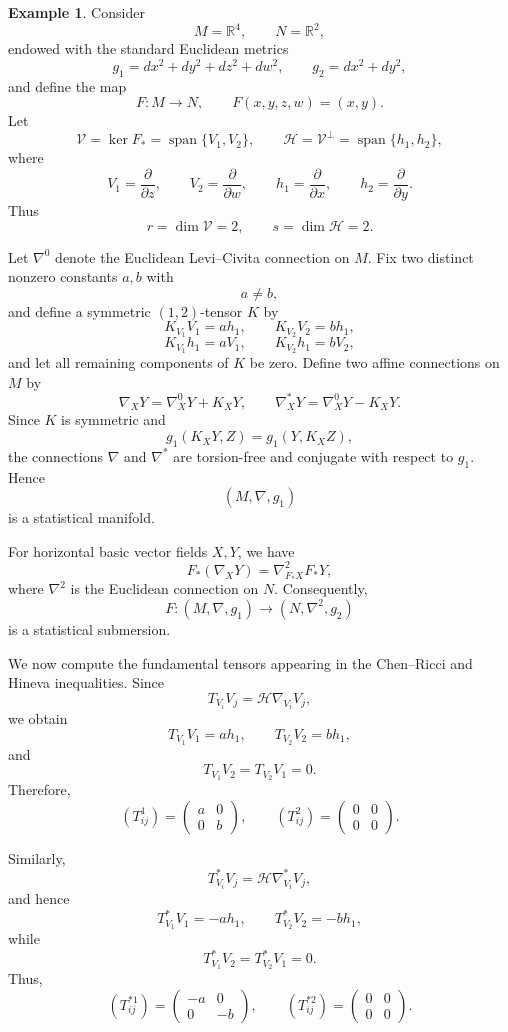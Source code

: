 \documentclass[10pt,a4paper]{article}
\theoremstyle{definition}
\newtheorem{example}[theorem]{Example}
\theoremstyle{remark}
\numberwithin{equation}{section}
\begin{document}
\begin{example}
Consider
\[
M=\mathbb{R}^{4},\qquad N=\mathbb{R}^{2},
\]
endowed with the standard Euclidean metrics
\[
g_{1}=dx^{2}+dy^{2}+dz^{2}+dw^{2},
\qquad
g_{2}=dx^{2}+dy^{2},
\]
and define the map
\[
F:M\longrightarrow N,\qquad
F(x,y,z,w)=(x,y).
\]
Let
\[
\mathcal{V}=\ker F_{*}
=\operatorname{span}\{V_{1},V_{2}\},
\qquad
\mathcal{H}=\mathcal{V}^{\perp}
=\operatorname{span}\{h_{1},h_{2}\},
\]
where
\[
V_{1}=\frac{\partial}{\partial z},\qquad
V_{2}=\frac{\partial}{\partial w},\qquad
h_{1}=\frac{\partial}{\partial x},\qquad
h_{2}=\frac{\partial}{\partial y}.
\]
Thus
\[
r=\dim\mathcal{V}=2,\qquad
s=\dim\mathcal{H}=2.
\]

Let $\nabla^{0}$ denote the Euclidean Levi--Civita connection on
$M$. Fix two distinct nonzero constants $a,b$ with
\[
a\neq b,
\]
and define a symmetric $(1,2)$-tensor $K$ by
\[
K_{V_{1}}V_{1}=ah_{1},\qquad
K_{V_{2}}V_{2}=bh_{1},
\]
\[
K_{V_{1}}h_{1}=aV_{1},\qquad
K_{V_{2}}h_{1}=bV_{2},
\]
and let all remaining components of $K$ be zero. Define two affine
connections on $M$ by
\[
\nabla_{X}Y=\nabla^{0}_{X}Y+K_{X}Y,
\qquad
\nabla^{*}_{X}Y=\nabla^{0}_{X}Y-K_{X}Y.
\]
Since $K$ is symmetric and
\[
g_{1}(K_{X}Y,Z)=g_{1}(Y,K_{X}Z),
\]
the connections $\nabla$ and $\nabla^{*}$ are torsion-free and
conjugate with respect to $g_{1}$. Hence
\[
(M,\nabla,g_{1})
\]
is a statistical manifold.

For horizontal basic vector fields $X,Y$, we have
\[
F_{*}(\nabla_{X}Y)
=
\nabla^{2}_{F_{*}X}F_{*}Y,
\]
where $\nabla^{2}$ is the Euclidean connection on $N$. Consequently,
\[
F:(M,\nabla,g_{1})
\longrightarrow
(N,\nabla^{2},g_{2})
\]
is a statistical submersion.

We now compute the fundamental tensors appearing in the
Chen--Ricci and Hineva inequalities. Since
\[
T_{V_{i}}V_{j}
=
\mathcal{H}\nabla_{V_{i}}V_{j},
\]
we obtain
\[
T_{V_{1}}V_{1}=ah_{1},\qquad
T_{V_{2}}V_{2}=bh_{1},
\]
and
\[
T_{V_{1}}V_{2}
=
T_{V_{2}}V_{1}
=
0.
\]
Therefore,
\[
\left(T^{1}_{ij}\right)
=
\begin{pmatrix}
a&0\\
0&b
\end{pmatrix},
\qquad
\left(T^{2}_{ij}\right)
=
\begin{pmatrix}
0&0\\
0&0
\end{pmatrix}.
\]

Similarly,
\[
T^{*}_{V_{i}}V_{j}
=
\mathcal{H}\nabla^{*}_{V_{i}}V_{j},
\]
and hence
\[
T^{*}_{V_{1}}V_{1}=-ah_{1},
\qquad
T^{*}_{V_{2}}V_{2}=-bh_{1},
\]
while
\[
T^{*}_{V_{1}}V_{2}
=
T^{*}_{V_{2}}V_{1}
=
0.
\]
Thus,
\[
\left(T^{*1}_{ij}\right)
=
\begin{pmatrix}
-a&0\\
0&-b
\end{pmatrix},
\qquad
\left(T^{*2}_{ij}\right)
=
\begin{pmatrix}
0&0\\
0&0
\end{pmatrix}.
\]


\end{example}
\end{document}

